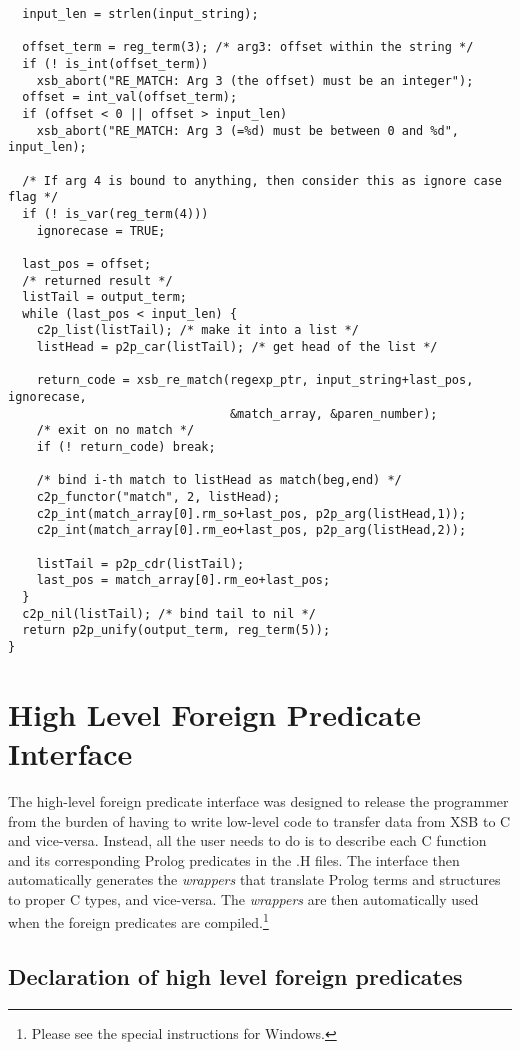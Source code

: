 \begin{verbatim}
  input_len = strlen(input_string);
  
  offset_term = reg_term(3); /* arg3: offset within the string */
  if (! is_int(offset_term))
    xsb_abort("RE_MATCH: Arg 3 (the offset) must be an integer");
  offset = int_val(offset_term);
  if (offset < 0 || offset > input_len)
    xsb_abort("RE_MATCH: Arg 3 (=%d) must be between 0 and %d", input_len);

  /* If arg 4 is bound to anything, then consider this as ignore case flag */
  if (! is_var(reg_term(4)))
    ignorecase = TRUE;

  last_pos = offset;
  /* returned result */
  listTail = output_term;
  while (last_pos < input_len) {
    c2p_list(listTail); /* make it into a list */
    listHead = p2p_car(listTail); /* get head of the list */

    return_code = xsb_re_match(regexp_ptr, input_string+last_pos, ignorecase,
                               &match_array, &paren_number);
    /* exit on no match */
    if (! return_code) break;

    /* bind i-th match to listHead as match(beg,end) */
    c2p_functor("match", 2, listHead);
    c2p_int(match_array[0].rm_so+last_pos, p2p_arg(listHead,1));
    c2p_int(match_array[0].rm_eo+last_pos, p2p_arg(listHead,2));

    listTail = p2p_cdr(listTail);
    last_pos = match_array[0].rm_eo+last_pos;
  }
  c2p_nil(listTail); /* bind tail to nil */
  return p2p_unify(output_term, reg_term(5));
}
\end{verbatim}

\section{High Level Foreign Predicate Interface}

The high-level foreign predicate interface was designed to release the
programmer from the burden of having to write low-level code to transfer
data from XSB to C and vice-versa.  Instead, all the user needs to
do is to describe each C function and its corresponding Prolog predicates
in the .H files. The interface then automatically generates the
\emph{wrappers} that translate Prolog terms and structures to proper C
types, and vice-versa. The \emph{wrappers} are then automatically used when
the foreign predicates are compiled.\footnote{Please see the special
  instructions for Windows.}

\subsection{Declaration of high level foreign predicates}

